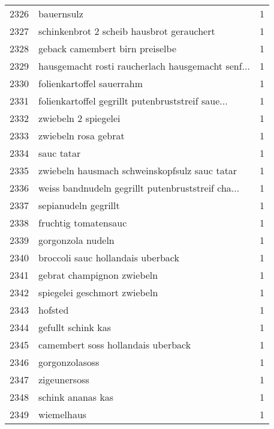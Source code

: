 \begin{tabular}{llr}
2326 &                                         bauernsulz &      1 \\
2327 &          schinkenbrot 2 scheib hausbrot gerauchert &      1 \\
2328 &                    geback camembert birn preiselbe &      1 \\
2329 &  hausgemacht rosti raucherlach hausgemacht senf... &      1 \\
2330 &                          folienkartoffel sauerrahm &      1 \\
2331 &  folienkartoffel gegrillt putenbruststreif saue... &      1 \\
2332 &                               zwiebeln 2 spiegelei &      1 \\
2333 &                               zwiebeln rosa gebrat &      1 \\
2334 &                                         sauc tatar &      1 \\
2335 &      zwiebeln hausmach schweinskopfsulz sauc tatar &      1 \\
2336 &  weiss bandnudeln gegrillt putenbruststreif cha... &      1 \\
2337 &                               sepianudeln gegrillt &      1 \\
2338 &                               fruchtig tomatensauc &      1 \\
2339 &                                  gorgonzola nudeln &      1 \\
2340 &                  broccoli sauc hollandais uberback &      1 \\
2341 &                         gebrat champignon zwiebeln &      1 \\
2342 &                       spiegelei geschmort zwiebeln &      1 \\
2343 &                                            hofsted &      1 \\
2344 &                                 gefullt schink kas &      1 \\
2345 &                 camembert soss hollandais uberback &      1 \\
2346 &                                     gorgonzolasoss &      1 \\
2347 &                                       zigeunersoss &      1 \\
2348 &                                  schink ananas kas &      1 \\
2349 &                                         wiemelhaus &      1 \\

\end{tabular}
